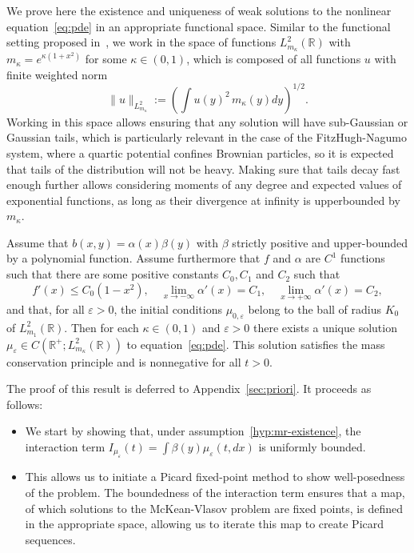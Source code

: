 \documentclass[onefignum,onetabnum]{siamart190516}
\newcommand{\R}{\mathbb{R}}
\newcommand{\1}{\mathbbm{1}}
\newcommand{\eps}{\varepsilon}
\newcommand{\review}[1]{\textcolor{midblue}{ #1}}
\renewcommand{\review}[1]{{ #1}}
\begin{document}
\review{We prove here the existence and uniqueness of weak solutions to the nonlinear equation~\eqref{eq:pde} in an appropriate functional space. Similar to the functional setting proposed in~\cite{mischler2015kinetic}, we work in the space of functions $L^2_{m_\kappa}(\R)$ with $m_\kappa = e^{\kappa(1+x^2)}$ for some  $\kappa\in(0,1)$, which is composed of all functions $u$ with finite weighted norm
 $$
 \|u\|_{L^2_{m_\kappa}}:= \left(\int u(y)^2\,m_\kappa(y) dy\right)^{1/2}.
 $$
 \review{Working in this space allows ensuring that any solution will have sub-Gaussian or Gaussian tails, which is particularly relevant in the case of the FitzHugh-Nagumo system, where a quartic potential confines Brownian particles, so it is expected that tails of the distribution will not be heavy. Making sure that tails decay fast enough further allows considering moments of any degree and expected values of exponential functions, as long as their divergence at infinity is upperbounded by $m_\kappa$. }
 \begin{theorem}
\label{th:MR-existence}
Assume that $b(x,y)=\alpha(x)\beta(y)$ with $\beta$ strictly positive and upper-bounded by a polynomial function. Assume furthermore that $f$ and $\alpha$ are $C^1$ functions such that there are some positive constants $C_0,C_1$ and $C_2$ such that
\begin{equation}
\label{hyp:mr-existence}
f'(x)\leq C_0(1-x^2),\quad \lim_{x\rightarrow-\infty}\alpha'(x)=C_1, \quad \lim_{x\rightarrow+\infty}\alpha'(x)=C_2,
\end{equation}
and that, for all $\eps>0$, the initial conditions $\mu_{0,\eps}$ belong to the ball of radius $K_0$ of $L^2_{m_1}(\R)$. Then for each $\kappa\in(0,1)$ and $\eps>0$ there exists a unique solution $\mu_\eps\in C(\R^+;L^2_{m_\kappa}(\R))$ to equation~\eqref{eq:pde}. This solution satisfies the mass conservation principle and is nonnegative for all $t>0$.
\end{theorem}
\review{The proof of this result is deferred to Appendix~\ref{sec:priori}. It proceeds as follows:
\begin{itemize}
\item We start by showing that, under assumption~\eqref{hyp:mr-existence}, the interaction term $I_{\mu_\eps}(t)=\int \beta(y)\mu_{\eps}(t,dx)$ is uniformly bounded. 
\item This allows us to initiate a Picard fixed-point method to show well-posedness of the problem. The boundedness of the interaction term ensures that a map, of which solutions to the McKean-Vlasov problem are fixed points, is defined in the appropriate space, allowing us to iterate this map to create Picard sequences.

\end{itemize}}}
\end{document}
